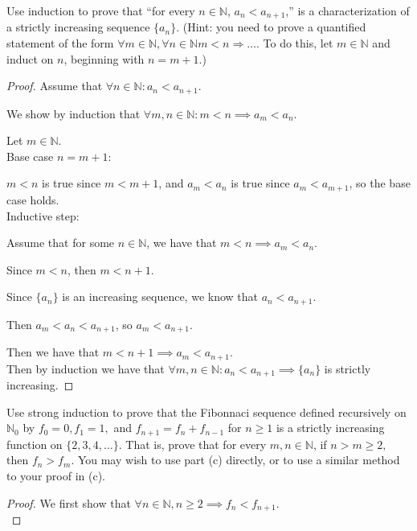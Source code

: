 \documentclass[12 pt]{exam}
\begin{document}
\begin{questions}
 
\question  Use induction to prove that ``for every $n\in \mathbb{N}$, $a_n < a_{n+1}$,'' is a characterization of a strictly increasing sequence $\{a_n\}$. (Hint: you need to prove a quantified statement of the form $\forall m \in \mathbb{N}, \forall n \in \mathbb{N} m<n \Rightarrow \ldots$. To do this, let $m\in \mathbb{N}$ and induct on $n$, beginning with $n=m+1$.)

\begin{solution}\begin{proof}
Assume that $\forall n \in \mathbb{N}: a_n < a_{n+1}$.

We show by induction that $\forall m,n \in \mathbb{N}: m < n \implies a_m < a_n$.

Let $m \in \mathbb{N}$.\\

Base case $n = m + 1$:

$m < n$ is true since $m < m + 1$, and $a_m < a_n$ is true since $a_m < a_{m+1}$, so the base case holds.\\

Inductive step:

Assume that for some $n \in \mathbb{N}$, we have that $m < n \implies a_m < a_n$.

Since $m < n$, then $m < n + 1$.

Since $\{a_n\}$ is an increasing sequence, we know that $a_n < a_{n+1}$.

Then $a_m < a_n < a_{n+1}$, so $a_m < a_{n+1}$.

Then we have that $m < n+1 \implies a_m < a_{n+1}$.\\

Then by induction we have that $\forall m,n \in \mathbb{N}: a_n < a_{n+1} \implies \{a_n\}$
is strictly increasing.
\end{proof}\end{solution}

 
\question  Use strong induction to prove that the Fibonnaci sequence defined recursively on $\mathbb{N}_0$ by $f_0=0,f_1=1,$ and $f_{n+1}=f_n+f_{n-1}$ for $n\geq1$ is a strictly increasing function on $\{2,3,4, \ldots \}$. That is, prove that for every $m,n\in\mathbb{N}$, if $n>m\geq2,$ then $f_n>f_m$. You may wish to use part (c) directly, or to use a similar method to your proof in (c).

\begin{solution}\begin{proof}
We first show that $\forall n \in \mathbb{N}, n \ge 2 \implies f_n < f_{n+1}$.\\


\end{proof}
\end{solution}
\end{questions}
\end{document}

